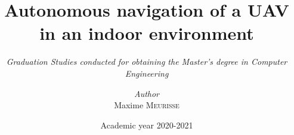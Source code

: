 \documentclass[a4paper, 12pt]{report}
\institute{\textbf{University of Liège}}
\title{Autonomous navigation of a UAV in an indoor environment}
\subtitle{\textit{Graduation Studies conducted for obtaining the Master's degree in Computer Engineering}}
\author{\textit{Author}\\Maxime \textsc{Meurisse}}
\date{Academic year 2020-2021}
\begin{document}

	\maketitle


	


	


	\tableofcontents


	
	
	
	
	
	
	
	


	\appendix

	


	\nocite{*}
	\printbibliography
\end{document}
